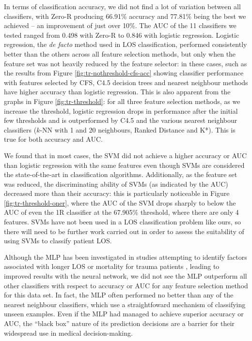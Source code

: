 

In terms of classification accuracy, we did not find a lot of variation
between all classifiers, with Zero-R producing 66.91\% accuracy and 77.81\%
being the best we achieved -- an improvement of just over 10\%. The AUC of
the 11 classifiers we tested ranged from 0.498 with Zero-R to 0.846 with
logistic regression. Logistic regression, the \textit{de facto} method
used in LOS classification, performed consistently better than the others
across all feature
selection methods, but only when the feature set was not heavily reduced by
the feature selector: in these cases, such as the results from Figure
\ref{fig:tr-nothreshold-cfs-acc} showing classifier performance with features
selected by CFS, C4.5 decision trees and nearest
neighbour methods have higher accuracy than logistic regression. This is also
apparent from the graphs in Figure \ref{fig:tr-threshold}: for all three
feature selection methods, as we increase the threshold, logistic regression
drops in performance after the initial few thresholds and is outperformed by
C4.5 and the various nearest neighbour classifiers ($k$-NN with 1 and 20
neighbours, Ranked Distance and K*). This is true for both accuracy and AUC.

We found that in most cases, the SVM did not achieve a higher accuracy or
AUC than logistic regression with the same features even though SVMs are
considered the state-of-the-art in classification algorithms. Additionally,
as the feature set was reduced, the discriminating ability of SVMs (as
indicated by the AUC) decreased more than their accuracy: this is particularly
noticeable in Figure \ref{fig:tr-threshold-oner}, where the AUC of the SVM
drops sharply to below the AUC of even the 1R classifier at the 67.905\%
threshold, where there are
only 4 features. SVMs have not been used in a LOS classification problem like
ours, so there will need to be further work carried out in order to assess the
suitability of using SVMs to classify patient LOS.

Although the MLP has been investigated in studies attempting to identify
factors associated with longer LOS or mortality for trauma patients
\cite{Hunter2000,McGonigal1993}, leading to improved results with the neural
network, we did not see the MLP outperform all other classifiers with respect
to accuracy or AUC for any feature selection method for this data set. In fact,
the MLP often performed no better than any of the nearest neighbour
classifiers, which use a straightfoward mechanism of classifying unseen
examples. Even if the MLP had managed to achieve superior accuracy or AUC, the
``black box'' nature of its prediction decisions are a barrier for their
widespread use in medical decision-making.

